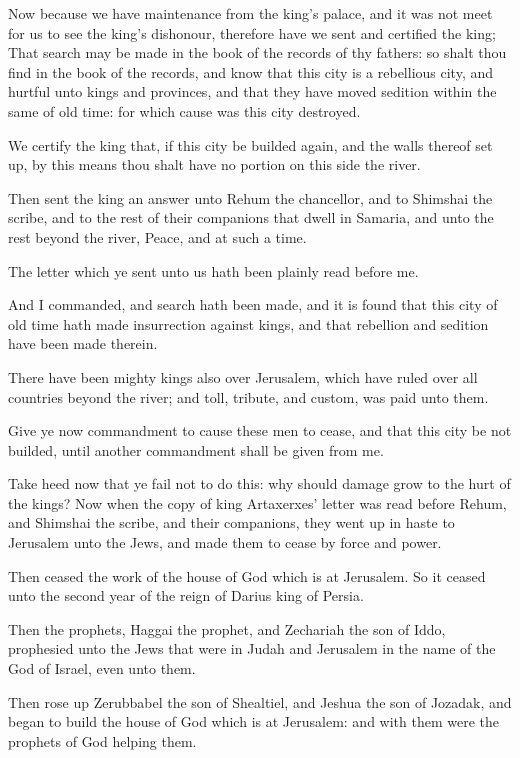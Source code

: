 \Verse Now because we have maintenance from the king's palace, and it was not meet for us to see the king's dishonour, therefore have we sent and certified the king; \Verse That search may be made in the book of the records of thy fathers: so shalt thou find in the book of the records, and know that this city is a rebellious city, and hurtful unto kings and provinces, and that they have moved sedition within the same of old time: for which cause was this city destroyed.

\Verse We certify the king that, if this city be builded again, and the walls thereof set up, by this means thou shalt have no portion on this side the river.

\Verse Then sent the king an answer unto Rehum the chancellor, and to Shimshai the scribe, and to the rest of their companions that dwell in Samaria, and unto the rest beyond the river, Peace, and at such a time.

\Verse The letter which ye sent unto us hath been plainly read before me.

\Verse And I commanded, and search hath been made, and it is found that this city of old time hath made insurrection against kings, and that rebellion and sedition have been made therein.

\Verse There have been mighty kings also over Jerusalem, which have ruled over all countries beyond the river; and toll, tribute, and custom, was paid unto them.

\Verse Give ye now commandment to cause these men to cease, and that this city be not builded, until another commandment shall be given from me.

\Verse Take heed now that ye fail not to do this: why should damage grow to the hurt of the kings?  \Verse Now when the copy of king Artaxerxes' letter was read before Rehum, and Shimshai the scribe, and their companions, they went up in haste to Jerusalem unto the Jews, and made them to cease by force and power.

\Verse Then ceased the work of the house of God which is at Jerusalem.  So it ceased unto the second year of the reign of Darius king of Persia.


\Chapter
\Verse Then the prophets, Haggai the prophet, and Zechariah the son of Iddo, prophesied unto the Jews that were in Judah and Jerusalem in the name of the God of Israel, even unto them.

\Verse Then rose up Zerubbabel the son of Shealtiel, and Jeshua the son of Jozadak, and began to build the house of God which is at Jerusalem: and with them were the prophets of God helping them.

